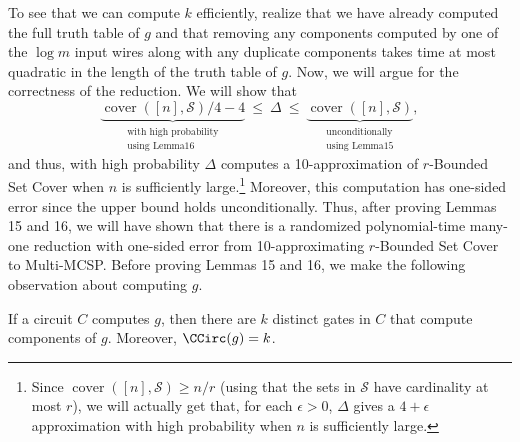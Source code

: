To see that we can compute $k$ efficiently, realize that we have already computed the full truth table of $g$ and that removing any components computed by one of the $\log m$ input wires along with any duplicate components takes time at most quadratic in the length of the truth table of $g$.
Now, we will argue for the correctness of the reduction. We will show that
\[\underbrace{\operatorname{cover}([n],\mathcal S)/4-4}_{\substack{\text{with high probability}\\\text{using Lemma16}}}\ \leq\ \Delta\ \leq\ \underbrace{\operatorname{cover}([n],\mathcal S)}_{\substack{\text{unconditionally}\\\text{using Lemma15}}},\]
and thus, with high probability $\Delta$ computes a 10-approximation of $r$-Bounded Set Cover when $n$ is sufficiently large.\footnote{Since $\operatorname{cover}([n],\mathcal S)\geq n/r$ (using that the sets in $\mathcal S$ have cardinality at most $r$), we will actually get that, for each $\epsilon>0$, $\Delta$ gives a $4+\epsilon$ approximation with high probability when $n$ is sufficiently large.} Moreover, this computation has one-sided error since the upper bound holds unconditionally.
Thus, after proving Lemmas 15 and 16, we will have shown that there is a randomized polynomial-time many-one reduction with one-sided error from 10-approximating $r$-Bounded Set Cover to Multi-MCSP.
Before proving Lemmas 15 and 16, we make the following observation about computing $g$.
\setcounter{nttheorem}{13}
\begin{ntproposition}
If a circuit $C$ computes $g$, then there are $k$ distinct gates in $C$ that compute components of $g$. Moreover, $\CCirc(g)=k$.
\end{ntproposition}
